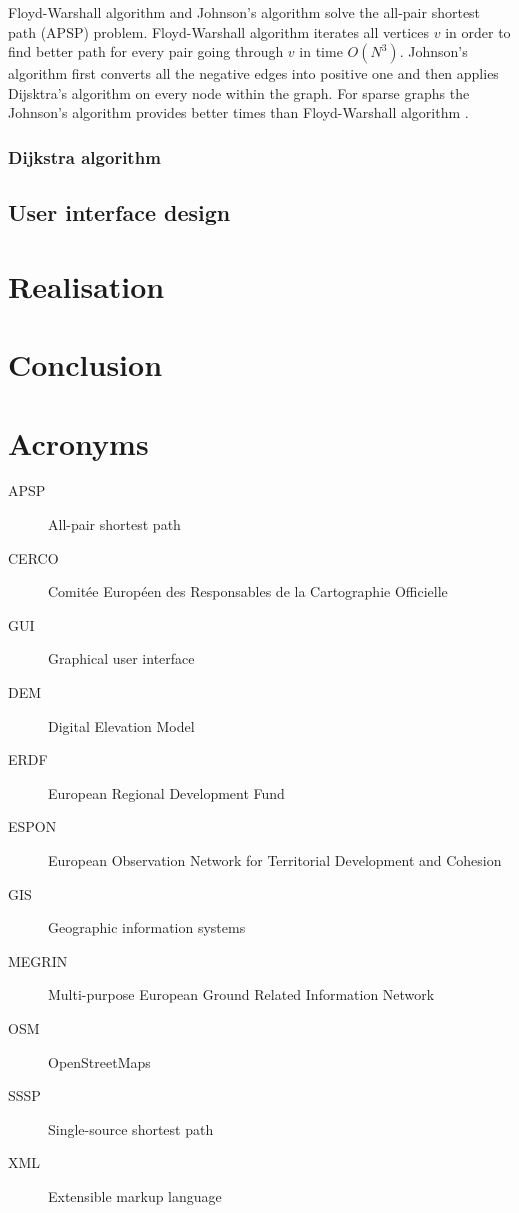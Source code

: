 \documentclass[thesis=M,english]{FITthesis}[2012/10/20]
\begin{document}
Floyd-Warshall algorithm \cite{Warshall62, Floyd56} and Johnson's algorithm \cite{Johnson77} solve the all-pair shortest path (APSP) problem. Floyd-Warshall algorithm iterates all vertices $v$ in order to find better path for every pair going through $v$ in time $O(N^3)$. Johnson's algorithm first converts all the negative edges into positive one and then applies Dijsktra's algorithm on every node within the graph. 
For sparse graphs the Johnson's algorithm provides better times than Floyd-Warshall algorithm \cite{Cormen01}.

\subsection{Dijkstra algorithm}

\section{User interface design}

\chapter{Realisation}

\chapter{Conclusion}





\appendix

\chapter{Acronyms}
\begin{description}
	\item[APSP] All-pair shortest path
	\item[CERCO] Comit{\' e}e Europ{\' e}en des Responsables de la Cartographie Officielle\item[GUI] Graphical user interface
	\item[DEM] Digital Elevation Model
	\item[ERDF] European Regional Development Fund
	\item[ESPON] European Observation Network for Territorial Development and Cohesion
	\item[GIS] Geographic information systems	
	\item[MEGRIN] Multi-purpose European Ground Related Information Network
	\item[OSM] OpenStreetMaps
	\item[SSSP] Single-source shortest path
	\item[XML] Extensible markup language
	
	
\end{description}
\end{document}
